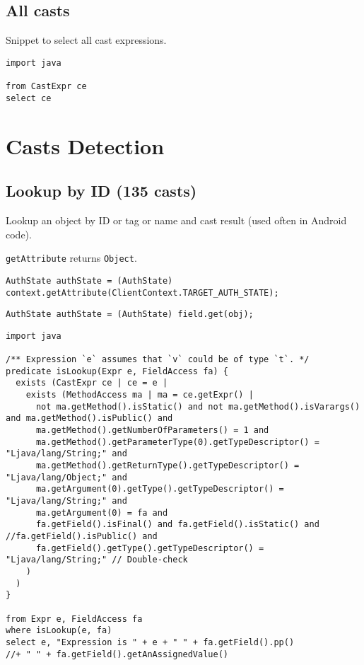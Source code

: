 \documentclass{usiinfdocprop}
\begin{document}
\section{All casts}
\label{sec:org2553a4b}
Snippet to select all cast expressions.

\lstset{language=ql,label= ,caption= ,captionpos=b,numbers=none}
\begin{lstlisting}
import java

from CastExpr ce
select ce
\end{lstlisting}

\chapter{Casts Detection}
\label{sec:orgec63aa7}
\section{Lookup by ID (135 casts)}
\label{sec:orgc096c00}
Lookup an object by ID or tag or name and cast result (used often in Android code). 

\texttt{getAttribute} returns \texttt{Object}. 

\lstset{language=java,label= ,caption= ,captionpos=b,numbers=none}
\begin{lstlisting}
AuthState authState = (AuthState) context.getAttribute(ClientContext.TARGET_AUTH_STATE); 
\end{lstlisting}

\lstset{language=java,label= ,caption= ,captionpos=b,numbers=none}
\begin{lstlisting}
AuthState authState = (AuthState) field.get(obj); 
\end{lstlisting}

\lstset{language=ql,label= ,caption= ,captionpos=b,numbers=none}
\begin{lstlisting}
import java

/** Expression `e` assumes that `v` could be of type `t`. */
predicate isLookup(Expr e, FieldAccess fa) {
  exists (CastExpr ce | ce = e | 
    exists (MethodAccess ma | ma = ce.getExpr() | 
      not ma.getMethod().isStatic() and not ma.getMethod().isVarargs() and ma.getMethod().isPublic() and 
      ma.getMethod().getNumberOfParameters() = 1 and
      ma.getMethod().getParameterType(0).getTypeDescriptor() = "Ljava/lang/String;" and
      ma.getMethod().getReturnType().getTypeDescriptor() = "Ljava/lang/Object;" and
      ma.getArgument(0).getType().getTypeDescriptor() = "Ljava/lang/String;" and
      ma.getArgument(0) = fa and
      fa.getField().isFinal() and fa.getField().isStatic() and //fa.getField().isPublic() and
      fa.getField().getType().getTypeDescriptor() = "Ljava/lang/String;" // Double-check
    )
  )
}

from Expr e, FieldAccess fa
where isLookup(e, fa)
select e, "Expression is " + e + " " + fa.getField().pp() 
//+ " " + fa.getField().getAnAssignedValue()
\end{lstlisting}
\end{document}
